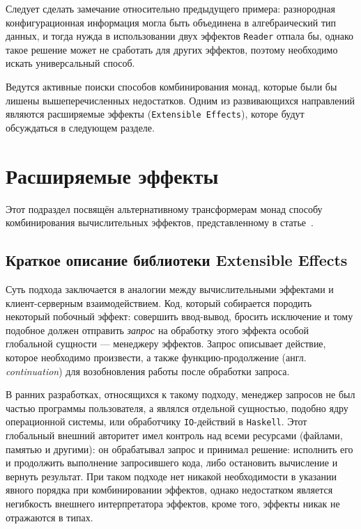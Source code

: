 Следует сделать замечание относительно предыдущего примера: разнородная 
конфигурационная информация могла быть объединена в алгебраический тип данных, 
и тогда нужда в использовании двух эффектов \lstinline{Reader} отпала бы, 
однако такое решение может не сработать для других эффектов, поэтому необходимо 
искать универсальный способ.

Ведутся активные поиски способов комбинирования монад, которые были бы лишены 
вышеперечисленных недостатков. Одним из развивающихся направлений являются 
расширяемые эффекты (\lstinline{Extensible Effects}), которе будут обсуждаться
в следующем разделе.

\section{Расширяемые эффекты}

Этот подраздел посвящён альтернативному трансформерам монад способу 
комбинирования вычислительных эффектов, 
представленному в статье~\cite{extEffects}.

\subsection{Краткое описание библиотеки Extensible Effects}

Суть подхода заключается в аналогии между вычислительными эффектами и 
клиент-серверным взаимодействием. Код, который собирается породить некоторый 
побочный эффект: совершить ввод-вывод, бросить исключение и тому подобное должен 
отправить \emph{запрос} на обработку этого эффекта особой глобальной сущности 
--- менеджеру эффектов. Запрос описывает действие, которое необходимо 
произвести, а также функцию-продолжение (англ. \emph{continuation}) для 
возобновления работы после обработки запроса.

В ранних разработках, относящихся к такому подходу, менеджер запросов не был 
частью программы пользователя, а являлся отдельной сущностью, подобно ядру 
операционной системы, или обработчику \lstinline{IO}-действий в 
\lstinline{Haskell}. Этот глобальный внешний авторитет имел контроль над всеми
ресурсами (файлами, памятью и другими): он обрабатывал запрос и принимал решение: 
исполнить его и продолжить выполнение запросившего кода, либо остановить 
вычисление и вернуть результат. При таком подходе нет никакой необходимости в
указании явного порядка при комбинировании эффектов, однако недостатком является
негибкость внешнего интерпретатора эффектов, кроме того, эффекты никак 
не отражаются в типах.

